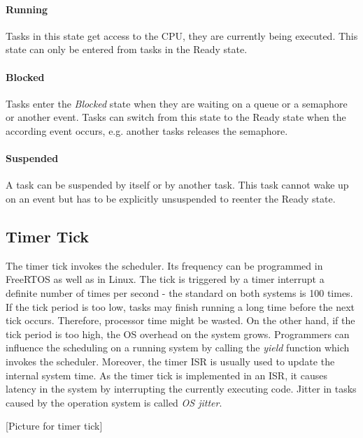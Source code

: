\paragraph{Running}
Tasks in this state get access to the \ac{CPU}, they are currently being executed.
This state can only be entered from tasks in the Ready state.

\paragraph{Blocked}
Tasks enter the \textit{Blocked} state when they are waiting on a queue or a semaphore or another event.
Tasks can switch from this state to the Ready state when the according event occurs, e.g. another tasks releases the semaphore.

\paragraph{Suspended}
A task can be suspended by itself or by another task. 
This task cannot wake up on an event but has to be explicitly unsuspended to reenter the Ready state.  

\subsection{Timer Tick}\label{ss_timer_tick}
The timer tick invokes the scheduler.
Its frequency can be programmed in FreeRTOS as well as in Linux.
The tick is triggered by a timer interrupt a definite number of times per second - the standard on both systems is 100 times. 
If the tick period is too low, tasks may finish running a long time before the next tick occurs.
Therefore, processor time might be wasted.
On the other hand, if the tick period is too high, the \ac{OS} overhead on the system grows. 
Programmers can influence the scheduling on a running system by calling the \textit{yield} function which invokes the scheduler.
Moreover, the timer \ac{ISR} is usually used to update the internal system time. 
As the timer tick is implemented in an \ac{ISR}, it causes latency in the system by interrupting the currently executing code. 
Jitter in tasks caused by the operation system is called \textit{OS jitter}.
 
[Picture for timer tick] 

